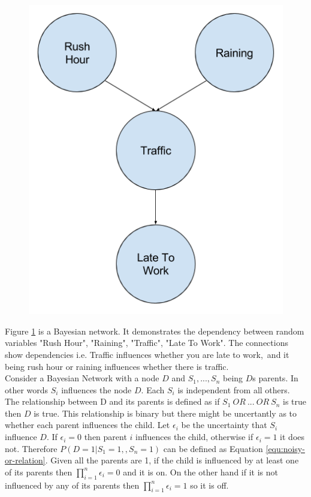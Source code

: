 \begin{figure}[H]
	\centering
	\begin{minipage}[b]{0.4\textwidth}
		\includegraphics[width=\textwidth]{bayesian-network-example.png}
		\caption{}
		\label{fig:bayesian-network-example}
	\end{minipage}
	\hfill
\end{figure}

Figure \ref{fig:bayesian-network-example} is a Bayesian network. It demonstrates the dependency between random variables "Rush Hour", "Raining", "Traffic", "Late To Work". The connections show dependencies i.e. Traffic influences whether you are late to work,\ and it being rush hour or raining influences whether there is traffic.\\

Consider a Bayesian Network with a node $D$ and $S_1,..., S_n$ being $D$s parents. In other words $S_i$ influences the node $D$. Each $S_i$ is independent from all others. The relationship between D and its parents is defined as if $S_1\ OR\ ...\ OR\ S_n$ is true then $D$ is true. This relationship is binary but there might be uncertantly as to whether each parent influences the child. Let $\epsilon_i$ be the uncertainty that $S_i$ influence $D$. If $\epsilon_i = 0$ then parent $i$ influences the child, otherwise if $\epsilon_i = 1$ it does not. Therefore $P(D = 1| S_1 = 1, , S_n = 1)$ can be defined as Equation \ref{equ:noisy-or-relation}. Given all the parents are 1, if the child is influenced by at least one of its parents then $\prod^n_{i=1} \epsilon_i = 0$ and it is on. On the other hand if it is not influenced by any of its parents then $\prod^n_{i=1} \epsilon_i = 1$ so it is off.

